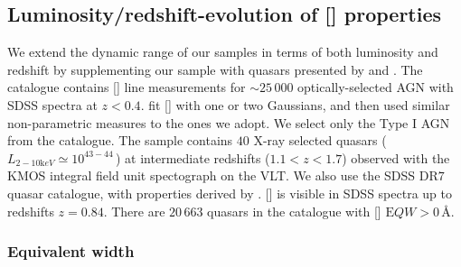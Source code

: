 \subsection{Luminosity/redshift-evolution of [] properties}

We extend the dynamic range of our samples in terms of both luminosity and redshift by supplementing our sample with quasars presented by \citet{mullaney13} and \citet{harrison16}. 
The \citet{mullaney13} catalogue contains [] line measurements for $\sim25\,000$ optically-selected AGN with SDSS spectra at $z<0.4$.
\citet{mullaney13} fit [] with one or two Gaussians, and then used similar non-parametric measures to the ones we adopt.
We select only the Type I AGN from the \citet{mullaney13} catalogue. 
The \citet{harrison16} sample contains $40$ X-ray selected quasars ($L_{2-10 {\mathrm keV}} \simeq 10^{43-44}$\,\ergs) at intermediate redshifts ($1.1 < z < 1.7$) observed with the KMOS integral field unit spectograph on the VLT. 
We also use the SDSS DR$7$ quasar catalogue, with properties derived by \citet{shen11}. 
[] is visible in SDSS spectra up to redshifts $z=0.84$. 
There are $20\,663$ quasars in the \citet{shen11} catalogue with [] ${\mathrm EQW} > 0$\,\AA. 

\subsubsection{Equivalent width}

